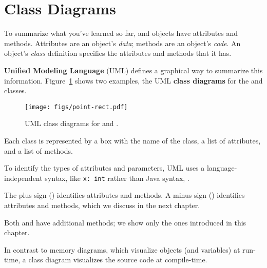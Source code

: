 

\section{Class Diagrams}
\label{mutable-objects_class-diagrams}
\label{UML}

To summarize what you've learned so far,  and  objects have attributes and methods.
Attributes are an object's {\em data}; methods are an object's {\em code}.
An object's {\em class} definition specifies the attributes and methods that it has.


{\bf Unified Modeling Language} (UML) defines a graphical way to summarize this information.
Figure~\ref{fig.umlPoint} shows two examples, the UML {\bf class diagrams} for the  and  classes.

\begin{figure}[!ht]
\begin{center}
\texttt{[image: figs/point-rect.pdf]}
\caption{UML class diagrams for  and .}
\label{fig.umlPoint}
\end{center}
\end{figure}


Each class is represented by a box with the name of the class,
a list of attributes, and a list of methods.


To identify the types of attributes and parameters, UML uses a language-independent syntax, like {\tt x:~int} rather than Java syntax, .

The plus sign (\java{+}) identifies  attributes and methods.
A minus sign (\java{-}) identifies  attributes and methods, which we discuss in the next chapter.

Both  and  have additional methods; we show only the ones introduced in this chapter.

In contrast to memory diagrams, which visualize objects (and variables) at run-time, a class diagram visualizes the source code at compile-time.


